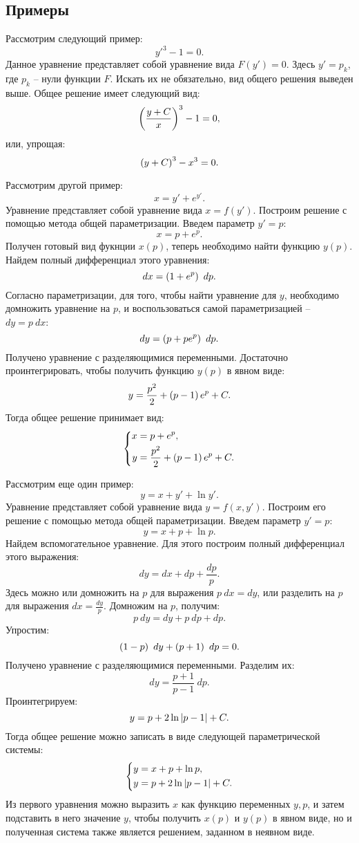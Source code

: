 	\subsection{Примеры}

		Рассмотрим следующий пример:
		\[ y'^3 - 1 = 0. \]
		Данное уравнение представляет собой уравнение вида $F(y') = 0$. Здесь $y' = p_k$, где $p_k$ -- нули функции $F$. Искать их не обязательно, вид общего решения выведен выше. Общее решение имеет следующий вид:
		\[ \left( \frac{y + C}{x} \right)^3 - 1 = 0, \]
		или, упрощая:
		\[ \left( y + C \right)^3 - x^3 = 0. \]

		Рассмотрим другой пример:
		\[ x = y' + e^{y'}. \]
		Уравнение представляет собой уравнение вида $x = f(y')$. Построим решение с помощью метода общей параметризации. Введем параметр $y' = p$:
		\[ x = p + e^p. \]
		Получен готовый вид фукнции $x(p)$, теперь необходимо найти функцию $y(p)$. Найдем полный дифференциал этого уравнения:
		\[ dx = \left( 1 + e^{p} \right) ~ dp. \]
		Согласно параметризации, для того, чтобы найти уравнение для $y$, необходимо домножить уравнение на $p$, и воспользоваться самой параметризацией -- $dy = p ~ dx$:
		\[ dy = \left( p + pe^{p} \right) ~ dp. \]
		Получено уравнение с разделяющимися переменными. Достаточно проинтегрировать, чтобы получить функцию $y(p)$ в явном виде:
		\[ y = \frac{p^2}{2} + \left( p - 1 \right) e^{p} + C. \]
		Тогда общее решение принимает вид:
		\[ \left\lbrace \begin{split} x &= p + e^{p}, \\ y &= \frac{p^2}{2} + \left( p-1 \right) e^{p} + C. \end{split} \right. \]

		Рассмотрим еще один пример:
		\[ y = x + y' + \ln{y'}. \]
		Уравнение представляет собой уравнение вида $y = f(x, y')$. Построим его решение с помощью метода общей параметризации. Введем параметр $y' = p$:
		\[ y = x + p + \ln{p}. \]
		Найдем вспомогательное уравнение. Для этого построим полный дифференциал этого выражения:
		\[ dy = dx + dp + \frac{dp}{p}. \]
		Здесь можно или домножить на $p$ для выражения $p ~ dx = dy$, или разделить на $p$ для выражения $dx = \frac{dy}{p}$. Домножим на $p$, получим:
		\[ p ~ dy = dy + p ~ dp + dp. \]
		Упростим:
		\[ \left( 1 - p \right) ~ dy + \left( p + 1 \right) ~ dp = 0. \]
		Получено уравнение с разделяющимися переменными. Разделим их:
		\[ dy = \frac{p + 1}{p - 1} ~ dp. \]
		Проинтегрируем:
		\[ y = p + 2\ln\left\vert p - 1 \right\vert + C. \]
		Тогда общее решение можно записать в виде следующей параметрической системы:
		\[ \left\lbrace \begin{split} y &= x + p + \ln{p}, \\ y &= p + 2 \ln\left\vert p-1 \right\vert + C. \end{split} \right. \]
		Из первого уравнения можно выразить $x$ как функцию переменных $y, p$, и затем подставить в него значение $y$, чтобы получить $x(p)$ и $y(p)$ в явном виде, но и полученная система также является решением, заданном в неявном виде.
